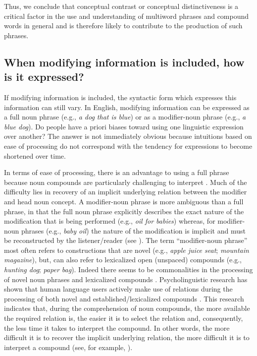 \documentclass[output=paper]{langsci/langscibook}
\begin{document}
Thus, we conclude that conceptual contrast or conceptual
distinctiveness is a critical factor in the use and understanding of
multiword phrases and compound words in general and is therefore
likely to contribute to the production of such phrases.

\subsection{When modifying information is included, how is it expressed?}

If modifying information is included, the syntactic form which
expresses this information can still vary. In English, modifying
information can be expressed as a full noun phrase (e.g., \textit{a dog that
is blue}) or as a modifier-noun phrase (e.g., \textit{a blue dog}). Do people
have a priori biases toward using one linguistic expression over
another? The answer is not immediately obvious because intuitions
based on ease of processing do not correspond with the tendency for
expressions to become shortened over time.

In terms of ease of processing, there is an advantage to using a full
phrase because noun compounds are particularly challenging to
interpret
\citep{lapata2002disambiguation,copestake2005noun,libben2014nature}. Much
of the difficulty lies in recovery of an implicit underlying relation
between the modifier and head noun concept. A modifier-noun phrase is
more ambiguous than a full phrase, in that the full noun phrase
explicitly describes the exact nature of the modification that is
being performed (e.g., \textit{oil for babies}) whereas, for
modifier-noun phrases (e.g., \textit{baby oil}) the nature of the
modification is implicit and must be reconstructed by the
listener/reader (see \citealt{levi1978syntax,gagne1997influence}). The
term “modifier-noun phrase” most often refers to constructions that
are novel (e.g., \textit{apple juice seat}; \textit{mountain
  magazine}), but, can also refer to lexicalized open (unspaced)
compounds (e.g., \textit{hunting dog}; \textit{paper bag}). Indeed
there seems to be commonalities in the processing of novel noun
phrases and lexicalized compounds \citep{gagne2006using}. Psycholinguistic research has shown that human language users actively make use of relations during the processing of
both novel and established/lexicalized compounds
\citep{gagne1997influence,gagne2002lexical,gagne2009constituent,gagne2014conceptual}. This
research indicates that, during the comprehension of noun compounds,
the more available the required relation is, the easier it is to
select the relation and, consequently, the less time it takes to
interpret the compound. In other words, the more difficult it is to
recover the implicit underlying relation, the more difficult it is to
interpret a compound (see, for example,
\citealt{gagne1997influence,spalding2014relational,schmidtke2018conceptual}).
\end{document}
